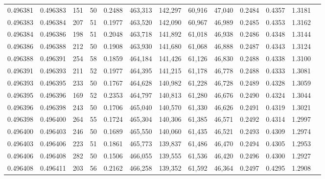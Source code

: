 \begin{tabular}{rrrrrrrrrrrrr}
0.496381 & 0.496383 &   151 &  50 &                                     0.2488 & 463,313 & 142,297 &  60,916 &  47,040 & 0.2484 & 0.4357 & 1.3181 \\
0.496383 & 0.496384 &   207 &  51 &                                     0.1977 & 463,520 & 142,090 &  60,967 &  46,989 & 0.2485 & 0.4353 & 1.3162 \\
0.496384 & 0.496386 &   198 &  51 &                                     0.2048 & 463,718 & 141,892 &  61,018 &  46,938 & 0.2486 & 0.4348 & 1.3144 \\
0.496386 & 0.496388 &   212 &  50 &                                     0.1908 & 463,930 & 141,680 &  61,068 &  46,888 & 0.2487 & 0.4343 & 1.3124 \\
0.496388 & 0.496391 &   254 &  58 &                                     0.1859 & 464,184 & 141,426 &  61,126 &  46,830 & 0.2488 & 0.4338 & 1.3100 \\
0.496391 & 0.496393 &   211 &  52 &                                     0.1977 & 464,395 & 141,215 &  61,178 &  46,778 & 0.2488 & 0.4333 & 1.3081 \\
0.496393 & 0.496395 &   233 &  50 &                                     0.1767 & 464,628 & 140,982 &  61,228 &  46,728 & 0.2489 & 0.4328 & 1.3059 \\
0.496395 & 0.496396 &   169 &  52 &                                     0.2353 & 464,797 & 140,813 &  61,280 &  46,676 & 0.2490 & 0.4324 & 1.3044 \\
0.496396 & 0.496398 &   243 &  50 &                                     0.1706 & 465,040 & 140,570 &  61,330 &  46,626 & 0.2491 & 0.4319 & 1.3021 \\
0.496398 & 0.496400 &   264 &  55 &                                     0.1724 & 465,304 & 140,306 &  61,385 &  46,571 & 0.2492 & 0.4314 & 1.2997 \\
0.496400 & 0.496403 &   246 &  50 &                                     0.1689 & 465,550 & 140,060 &  61,435 &  46,521 & 0.2493 & 0.4309 & 1.2974 \\
0.496403 & 0.496406 &   223 &  51 &                                     0.1861 & 465,773 & 139,837 &  61,486 &  46,470 & 0.2494 & 0.4305 & 1.2953 \\
0.496406 & 0.496408 &   282 &  50 &                                     0.1506 & 466,055 & 139,555 &  61,536 &  46,420 & 0.2496 & 0.4300 & 1.2927 \\
0.496408 & 0.496411 &   203 &  56 &                                     0.2162 & 466,258 & 139,352 &  61,592 &  46,364 & 0.2497 & 0.4295 & 1.2908 \\

\end{tabular}
